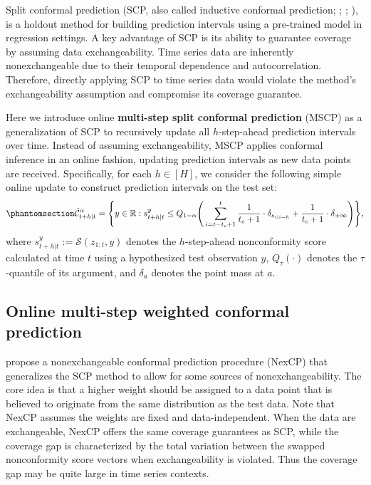 \documentclass[
  11pt,
  a4paper,
]{article}
\theoremstyle{plain}
\theoremstyle{remark}
\begin{document}
Split conformal prediction (SCP, also called inductive conformal
prediction; \textcite{papadopoulos2002}; \textcite{vovk2005};
\textcite{lei2018}), is a holdout method for building prediction
intervals using a pre-trained model in regression settings. A key
advantage of SCP is its ability to guarantee coverage by assuming data
exchangeability. Time series data are inherently nonexchangeable due to
their temporal dependence and autocorrelation. Therefore, directly
applying SCP to time series data would violate the method's
exchangeability assumption and compromise its coverage guarantee.

Here we introduce online \textbf{multi-step split conformal prediction}
(MSCP) as a generalization of SCP to recursively update all
\(h\)-step-ahead prediction intervals over time. Instead of assuming
exchangeability, MSCP applies conformal inference in an online fashion,
updating prediction intervals as new data points are received.
Specifically, for each \(h \in [H]\), we consider the following simple
online update to construct prediction intervals on the test set:
\begin{equation}\phantomsection\label{eq-mscp}{
\hat{\mathcal{C}}_{t+h|t}^{\alpha} = \Bigg\{y\in\mathbb{R}: s_{t+h|t}^{y} \leq Q_{1-\alpha}\Bigg(\sum_{i=t-t_c+1}^{t}\frac{1}{t_c+1}\cdot\delta_{s_{i|i-h}}+\frac{1}{t_c+1}\cdot\delta_{+\infty}\Bigg)\Bigg\},
}\end{equation} where \(s_{t+h|t}^{y}:=\mathcal{S}(z_{1:t}, y)\) denotes
the \(h\)-step-ahead nonconformity score calculated at time \(t\) using
a hypothesized test observation \(y\), \(Q_\tau(\cdot)\) denotes the
\(\tau\)-quantile of its argument, and \(\delta_a\) denotes the point
mass at \(a\).

\subsection{Online multi-step weighted conformal
prediction}\label{online-multi-step-weighted-conformal-prediction}

\textcite{barber2023} propose a nonexchangeable conformal prediction
procedure (NexCP) that generalizes the SCP method to allow for some
sources of nonexchangeability. The core idea is that a higher weight
should be assigned to a data point that is believed to originate from
the same distribution as the test data. Note that NexCP assumes the
weights are fixed and data-independent. When the data are exchangeable,
NexCP offers the same coverage guarantees as SCP, while the coverage gap
is characterized by the total variation between the swapped
nonconformity score vectors when exchangeability is violated. Thus the
coverage gap may be quite large in time series contexts.
\end{document}
